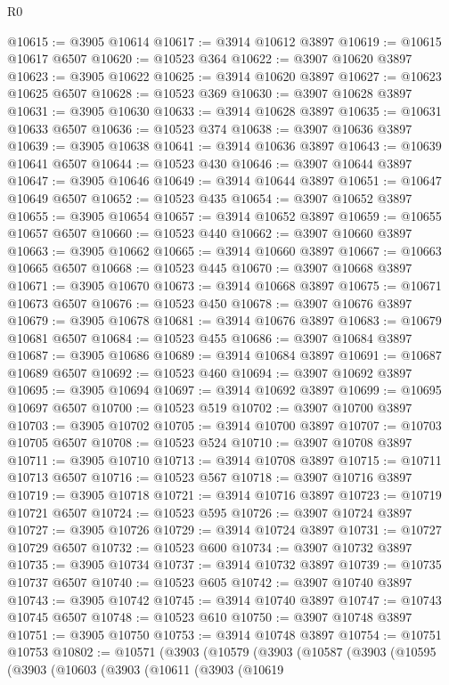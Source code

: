 \begin{lexlean}{R0}
\begin{coremodule}
@10615 := @3905 @10614
@10617 := @3914 @10612 @3897
@10619 := @10615 @10617 @6507
@10620 := @10523 @364
@10622 := @3907 @10620 @3897
@10623 := @3905 @10622
@10625 := @3914 @10620 @3897
@10627 := @10623 @10625 @6507
@10628 := @10523 @369
@10630 := @3907 @10628 @3897
@10631 := @3905 @10630
@10633 := @3914 @10628 @3897
@10635 := @10631 @10633 @6507
@10636 := @10523 @374
@10638 := @3907 @10636 @3897
@10639 := @3905 @10638
@10641 := @3914 @10636 @3897
@10643 := @10639 @10641 @6507
@10644 := @10523 @430
@10646 := @3907 @10644 @3897
@10647 := @3905 @10646
@10649 := @3914 @10644 @3897
@10651 := @10647 @10649 @6507
@10652 := @10523 @435
@10654 := @3907 @10652 @3897
@10655 := @3905 @10654
@10657 := @3914 @10652 @3897
@10659 := @10655 @10657 @6507
@10660 := @10523 @440
@10662 := @3907 @10660 @3897
@10663 := @3905 @10662
@10665 := @3914 @10660 @3897
@10667 := @10663 @10665 @6507
@10668 := @10523 @445
@10670 := @3907 @10668 @3897
@10671 := @3905 @10670
@10673 := @3914 @10668 @3897
@10675 := @10671 @10673 @6507
@10676 := @10523 @450
@10678 := @3907 @10676 @3897
@10679 := @3905 @10678
@10681 := @3914 @10676 @3897
@10683 := @10679 @10681 @6507
@10684 := @10523 @455
@10686 := @3907 @10684 @3897
@10687 := @3905 @10686
@10689 := @3914 @10684 @3897
@10691 := @10687 @10689 @6507
@10692 := @10523 @460
@10694 := @3907 @10692 @3897
@10695 := @3905 @10694
@10697 := @3914 @10692 @3897
@10699 := @10695 @10697 @6507
@10700 := @10523 @519
@10702 := @3907 @10700 @3897
@10703 := @3905 @10702
@10705 := @3914 @10700 @3897
@10707 := @10703 @10705 @6507
@10708 := @10523 @524
@10710 := @3907 @10708 @3897
@10711 := @3905 @10710
@10713 := @3914 @10708 @3897
@10715 := @10711 @10713 @6507
@10716 := @10523 @567
@10718 := @3907 @10716 @3897
@10719 := @3905 @10718
@10721 := @3914 @10716 @3897
@10723 := @10719 @10721 @6507
@10724 := @10523 @595
@10726 := @3907 @10724 @3897
@10727 := @3905 @10726
@10729 := @3914 @10724 @3897
@10731 := @10727 @10729 @6507
@10732 := @10523 @600
@10734 := @3907 @10732 @3897
@10735 := @3905 @10734
@10737 := @3914 @10732 @3897
@10739 := @10735 @10737 @6507
@10740 := @10523 @605
@10742 := @3907 @10740 @3897
@10743 := @3905 @10742
@10745 := @3914 @10740 @3897
@10747 := @10743 @10745 @6507
@10748 := @10523 @610
@10750 := @3907 @10748 @3897
@10751 := @3905 @10750
@10753 := @3914 @10748 @3897
@10754 := @10751 @10753
@10802 := @10571
    (@3903
      (@10579
        (@3903
          (@10587
            (@3903
              (@10595
                (@3903
                  (@10603
                    (@3903
                      (@10611
                        (@3903
                          (@10619

\end{coremodule}
\end{lexlean}
